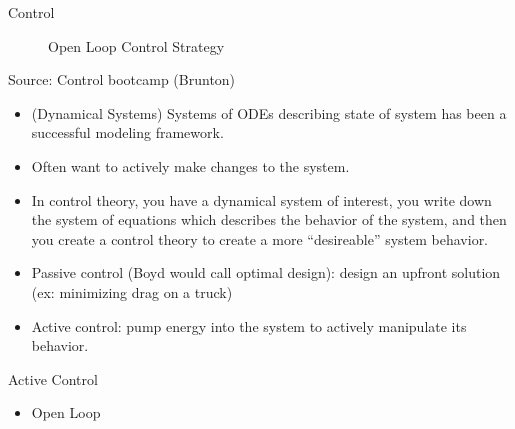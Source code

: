 \begin{chapter}{Control}
\begin{figure}[h!]
        \caption{Open Loop Control Strategy}
        \label{fig:block_diagram}
    \end{figure}

    Source: Control bootcamp (Brunton)
    \begin{itemize}
        \item (Dynamical Systems) Systems of ODEs describing state of system has been a successful modeling framework.
        \item Often want to actively make changes to the system. 
        \item In control theory, you have a dynamical system of interest, you write down the system of equations 
        which describes the behavior of the system, and then you create a control theory to create a more ``desireable''
        system behavior.
        \item Passive control (Boyd would call optimal design): design an upfront solution (ex: minimizing drag on a truck)
        \item Active control: pump energy into the system to actively manipulate its behavior.
    \end{itemize}

    \noindent Active Control
    \begin{itemize}
        \item Open Loop
    \end{itemize}





\end{chapter}
